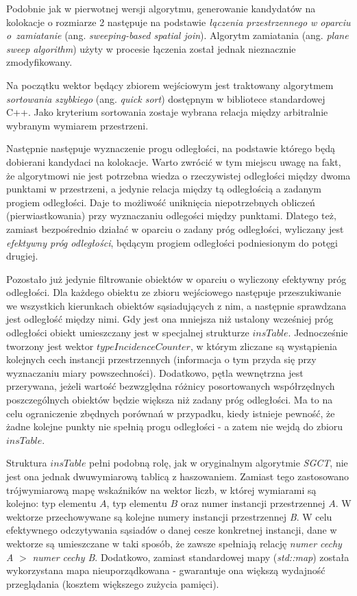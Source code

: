 \documentclass[12pt]{article}
\begin{document}
Podobnie jak w pierwotnej wersji algorytmu, generowanie kandydatów na kolokacje o rozmiarze 2 następuje na podstawie \textit{łączenia przestrzennego w oparciu o~zamiatanie} (ang. \textit{sweeping-based spatial join}). Algorytm zamiatania (ang. \textit{plane sweep algorithm}) użyty w procesie łączenia został jednak nieznacznie zmodyfikowany.

Na początku wektor będący zbiorem wejściowym jest traktowany algorytmem \textit{sortowania szybkiego} (ang. \textit{quick sort}) dostępnym w bibliotece standardowej C++. Jako kryterium sortowania zostaje wybrana relacja między arbitralnie wybranym wymiarem przestrzeni.

Następnie następuje wyznaczenie progu odległości, na podstawie którego będą dobierani kandydaci na kolokacje. Warto zwrócić w tym miejscu uwagę na fakt, że algorytmowi nie jest potrzebna wiedza o rzeczywistej odległości między dwoma punktami w przestrzeni, a jedynie relacja między tą odległością a zadanym progiem odległości. Daje to możliwość uniknięcia niepotrzebnych obliczeń (pierwiastkowania) przy wyznaczaniu odlegości między punktami. Dlatego też, zamiast bezpośrednio działać w oparciu o zadany próg odległości, wyliczany jest \textit{efektywny próg odległości}, będącym progiem odległości podniesionym do potęgi drugiej. 

Pozostało już jedynie filtrowanie obiektów w oparciu o wyliczony efektywny próg odległości. Dla każdego obiektu ze zbioru wejściowego następuje przeszukiwanie we wszystkich kierunkach obiektów sąsiadujących z nim, a następnie sprawdzana jest odległość między nimi. Gdy jest ona mniejsza niż ustalony wcześniej próg odległości obiekt umieszczany jest w specjalnej strukturze $ insTable $. Jednocześnie tworzony jest wektor $ typeIncidenceCounter$, w którym zliczane są wystąpienia kolejnych cech instancji przestrzennych (informacja o tym przyda się przy wyznaczaniu miary powszechności). Dodatkowo, pętla wewnętrzna jest przerywana, jeżeli wartość bezwzględna różnicy posortowanych współrzędnych poszczególnych obiektów będzie większa niż zadany próg odległości. Ma to na celu ograniczenie zbędnych porównań w przypadku, kiedy istnieje pewność, że żadne kolejne punkty nie spełnią progu odległości - a zatem nie wejdą do zbioru $ insTable $.
 
Struktura $ insTable $ pełni podobną rolę, jak w oryginalnym algorytmie \textit{SGCT}, nie jest ona jednak dwuwymiarową tablicą z haszowaniem. Zamiast tego zastosowano trójwymiarową mapę wskaźników na wektor liczb, w której wymiarami są kolejno: typ elementu $ A $, typ elementu $ B $ oraz numer instancji przestrzennej $ A $.  W wektorze przechowywane są kolejne numery instancji przestrzennej \textit{B}. W celu efektywnego odczytywania sąsiadów o danej cesze konkretnej instancji, dane w wektorze są umieszczane w taki sposób, że zawsze spełniają relację \textit{numer cechy A} $ > $ \textit{numer cechy B}. Dodatkowo, zamiast standardowej mapy (\textit{std::map}) została wykorzystana mapa nieuporządkowana - gwarantuje ona większą wydajność przeglądania (kosztem większego zużycia pamięci).
\end{document}
